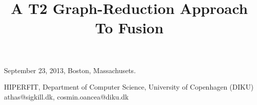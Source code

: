 \documentclass{sigplanconf}  %
\newcommand{\LO}{$\mathcal{L}_0$}
\newcommand{\comment}[2]{\textcolor{red}{\scriptsize \textsf \textbf{#1:}{#2}}}
\begin{document}

 {September 23, 2013, Boston, Massachusets.}


\title{A T2 Graph-Reduction Approach To Fusion}


           {HIPERFIT, Department of Computer Science, University of Copenhagen (DIKU)}
           {athas@sigkill.dk, cosmin.oancea@diku.dk}



\maketitle
\end{document}
